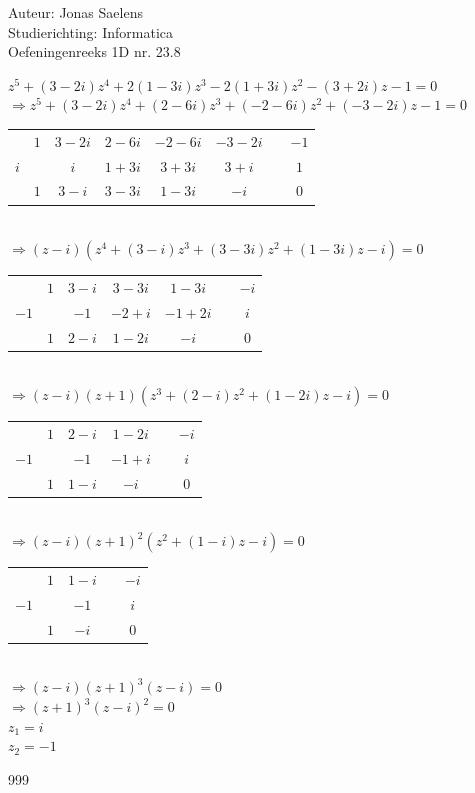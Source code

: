 \documentclass[a4paper]{article}
\begin{document}
\noindent \large Auteur: Jonas Saelens \\
\noindent \large Studierichting: Informatica\\
\noindent \large Oefeningenreeks 1D nr. 23.8\\

\medskip

\normalsize

$z^5+(3-2i)z^4+2(1-3i)z^3-2(1+3i)z^2-(3+2i)z-1 = 0$ \\

$\Rightarrow z^5+(3-2i)z^4+(2-6i)z^3+(-2-6i)z^2+(-3-2i)z-1 = 0$ \\

\begin{tabular}{c|ccccccc}
  & $1$ & $3-2i$ & $2-6i$ & $-2-6i$ & $-3-2i$ & \vline & $-1$ \\
$i$ & & $i$ & $1+3i$ & $3+3i$ & $3+i$ & \vline & $1$ \\ \hline
  & $1$ & $3-i$ & $3-3i$ & $1-3i$ & $-i$ & \vline & $0$
\end{tabular} \\

$\Rightarrow (z-i)(z^4+(3-i)z^3+(3-3i)z^2+(1-3i)z-i) = 0$ \\

\begin{tabular}{r|cccccc}
  & $1$ & $3-i$ & $3-3i$ & $1-3i$ & \vline & $-i$ \\
$-1$ & & $-1$ & $-2+i$ & $-1+2i$ & \vline & $i$ \\ \hline
  & $1$ & $2-i$ & $1-2i$ & $-i$ & \vline & $0$
\end{tabular} \\

$\Rightarrow (z-i)(z+1)(z^3+(2-i)z^2+(1-2i)z-i) = 0$ \\

\begin{tabular}{r|ccccc}
  & $1$ & $2-i$ & $1-2i$ & \vline & $-i$ \\
$-1$ & & $-1$ & $-1+i$ & \vline & $i$ \\ \hline
  & $1$ & $1-i$ & $-i$ & \vline & $0$
\end{tabular} \\

$\Rightarrow (z-i)(z+1)^2(z^2+(1-i)z-i) = 0$ \\

\begin{tabular}{r|cccc}
  & $1$ & $1-i$ & \vline & $-i$ \\
$-1$ & & $-1$ & \vline & $i$ \\ \hline
  & $1$ & $-i$ & \vline & $0$
\end{tabular} \\

$\Rightarrow (z-i)(z+1)^3(z-i) = 0$ \\

$\Rightarrow (z+1)^3(z-i)^2 = 0$ \\

$z_1 = i$ \\

$z_2 = -1$ \\


\begin{thebibliography}{999}
\end{thebibliography}
\end{document}
